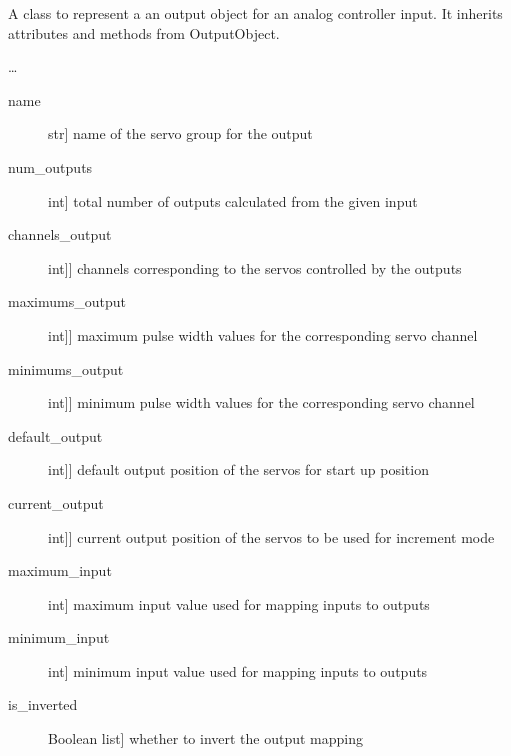 \documentclass[letterpaper,10pt,english]{sphinxmanual}
\begin{document}
\begin{fulllineitems}
\label{\detokenize{generic:AnalogOutputObject.AnalogOutputObject}}
\sphinxAtStartPar
A class to represent a an output object for an analog controller input.
It inherits attributes and methods from OutputObject.

\sphinxAtStartPar
…
\begin{description}
\item[{name}] \leavevmode{[}str{]}
\sphinxAtStartPar
name of the servo group for the output

\item[{num\_outputs}] \leavevmode{[}int{]}
\sphinxAtStartPar
total number of outputs calculated from the given input

\item[{channels\_output}] \leavevmode{[}{[}int{]}{]}
\sphinxAtStartPar
channels corresponding to the servos controlled by the outputs

\item[{maximums\_output}] \leavevmode{[}{[}int{]}{]}
\sphinxAtStartPar
maximum pulse width values for the corresponding servo channel

\item[{minimums\_output}] \leavevmode{[}{[}int{]}{]}
\sphinxAtStartPar
minimum pulse width values for the corresponding servo channel

\item[{default\_output}] \leavevmode{[}{[}int{]}{]}
\sphinxAtStartPar
default output position of the servos for start up position

\item[{current\_output}] \leavevmode{[}{[}int{]}{]}
\sphinxAtStartPar
current output position of the servos to be used for increment mode

\item[{maximum\_input}] \leavevmode{[}int{]}
\sphinxAtStartPar
maximum input value used for mapping inputs to outputs

\item[{minimum\_input}] \leavevmode{[}int{]}
\sphinxAtStartPar
minimum input value used for mapping inputs to outputs

\item[{is\_inverted}] \leavevmode{[}Boolean list{]}
\sphinxAtStartPar
whether to invert the output mapping


\end{description}
\end{fulllineitems}
\end{document}
